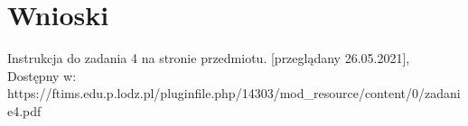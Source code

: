 \documentclass[12pt]{article}
\begin{document}

\section{Wnioski}

\begin{thebibliography}{}
 Instrukcja do zadania 4 na stronie przedmiotu. [przeglądany 26.05.2021], Dostępny w: https://ftims.edu.p.lodz.pl/pluginfile.php/14303/mod\_resource/content/0/zadanie4.pdf


\end{thebibliography}
\end{document}
